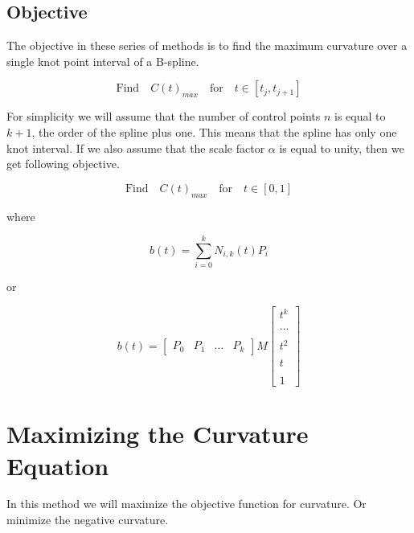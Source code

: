 \documentclass{article}
\begin{document}
\subsection{Objective}

The objective in these series of methods is to find the maximum curvature over a single knot point interval of a B-spline.

\begin{equation}
    \text{Find} \quad C(t)_{max} \quad \text{for} \quad t \in [t_j,t_{j+1}]
\end{equation}

For simplicity we will assume that the number of control points \(n\) is equal to \(k + 1\), the order of the spline plus one. This means that the spline has only one knot interval. If we also assume that the scale factor \(\alpha\) is equal to unity, then we get following objective.

\begin{equation}
    \text{Find} \quad C(t)_{max} \quad \text{for} \quad t \in [0,1]
\end{equation}

where

   \begin{equation} \label{eq:B-Spline equation}
      b(t) = \sum^{k}_{i=0} N_{i,k}(t) P_i
  \end{equation}
  
  or
  
  \begin{equation}
    b(t) = \begin{bmatrix} P_{0} & P_{1} & ... & P_{k}\end{bmatrix} M \begin{bmatrix} t^k \\ \\ ... \\ \\ t^2 \\ \\ t \\ \\ 1 \end{bmatrix}
\end{equation}

\section{Maximizing the Curvature Equation}

In this method we will maximize the objective function for curvature. Or minimize the negative curvature.
\end{document}
